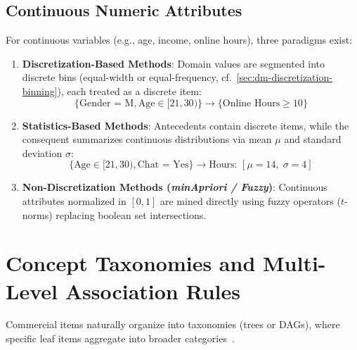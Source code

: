 \subsection{Continuous Numeric Attributes}
For continuous variables (e.g., age, income, online hours), three paradigms exist:
\begin{enumerate}
    \item \textbf{Discretization-Based Methods}: Domain values are segmented into discrete bins (equal-width or equal-frequency, cf.~\autoref{sec:dm-discretization-binning}), each treated as a discrete item:
    \begin{equation}
    \{\text{Gender = M}, \text{Age} \in [21, 30)\} \longrightarrow \{\text{Online Hours} \ge 10\}
    \end{equation}
    \item \textbf{Statistics-Based Methods}: Antecedents contain discrete items, while the consequent summarizes continuous distributions via mean $\mu$ and standard deviation $\sigma$:
    \begin{equation}
    \{\text{Age} \in [21, 30), \text{Chat = Yes}\} \longrightarrow \text{Hours: } [\mu = 14, \; \sigma = 4]
    \end{equation}
    \item \textbf{Non-Discretization Methods (\textit{minApriori / Fuzzy})}: Continuous attributes normalized in $[0, 1]$ are mined directly using fuzzy operators ($t$-norms) replacing boolean set intersections.
\end{enumerate}

\section{Concept Taxonomies and Multi-Level Association Rules}
\label{sec:dm-multilevel-association-rules}

Commercial items naturally organize into taxonomies (trees or DAGs), where specific leaf items aggregate into broader categories~\cite{tan2018}.

